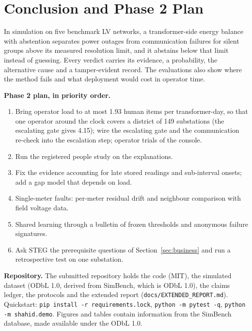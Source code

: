 \section{Conclusion and Phase 2 Plan}\label{sec:conclusion}
In simulation on five benchmark LV networks, a transformer-side energy balance with abstention
separates power outages from communication failures for silent groups above its measured resolution
limit, and it abstains below that limit instead of guessing. Every verdict carries its evidence, a
probability, the alternative cause and a tamper-evident record. The evaluations also show where the
method fails and what deployment would cost in operator time.

\textbf{Phase 2 plan, in priority order.}
\begin{enumerate}[leftmargin=1.4em]
\item Bring operator load to at most 1.93 human items per transformer-day, so that one operator around
the clock covers a district of 149 substations (the escalating gate gives 4.15); wire the escalating
gate and the communication re-check into the escalation step; operator trials of the console.
\item Run the registered people study on the explanations.
\item Fix the evidence accounting for late stored readings and sub-interval onsets; add a gap model
that depends on load.
\item Single-meter faults: per-meter residual drift and neighbour comparison with field voltage data.
\item Shared learning through a bulletin of frozen thresholds and anonymous failure signatures.
\item Ask STEG the prerequisite questions of Section~\ref{sec:business} and run a retrospective test on
one substation.
\end{enumerate}

\textbf{Repository.} The submitted repository holds the code (MIT), the simulated dataset (ODbL 1.0,
derived from SimBench, which is ODbL 1.0), the claims ledger, the protocols and the extended report
(\texttt{docs/EXTENDED\_REPORT.md}). Quickstart: \texttt{pip install -r requirements.lock}, \texttt{python -m pytest -q},
\texttt{python -m shahid.demo}. Figures and tables contain information from the SimBench database,
made available under the ODbL 1.0.

